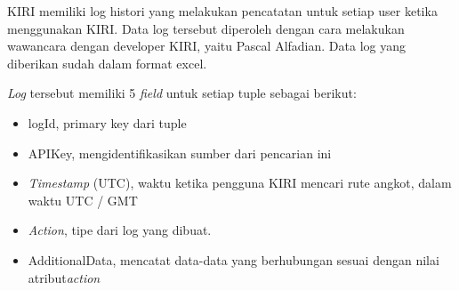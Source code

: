 KIRI memiliki log histori yang melakukan pencatatan untuk setiap user ketika menggunakan KIRI. Data log tersebut diperoleh dengan cara melakukan wawancara dengan developer KIRI, yaitu Pascal Alfadian. Data log yang diberikan sudah dalam format excel.

\textsl{Log} tersebut memiliki 5 \textsl{field} untuk setiap tuple sebagai berikut:
\begin{itemize}
	\item logId, primary key dari tuple
	\item APIKey, mengidentifikasikan sumber dari pencarian ini
	\item \textsl{Timestamp} (UTC), waktu ketika pengguna KIRI mencari rute angkot, dalam waktu UTC / GMT
	\item \textsl{Action}, tipe dari log yang dibuat.
	\item AdditionalData, mencatat data-data yang berhubungan sesuai dengan nilai atribut\textsl{action}
\end{itemize}

